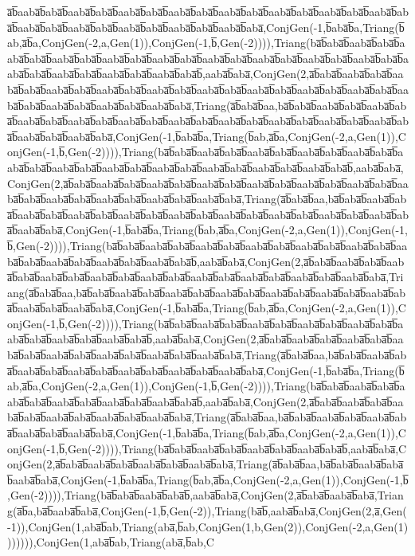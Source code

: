 a̅b̅aaba̅b̅aba̅b̅aaba̅b̅aba̅b̅aaba̅b̅aba̅b̅aaba̅b̅aba̅b̅aaba̅b̅aba̅b̅aaba̅b̅aba̅b̅aaba̅b̅aba̅b̅aaba̅b̅aba̅b̅aaba̅b̅aba̅b̅aaba̅b̅aba̅b̅aaba̅b̅aba̅b̅aaba̅b̅aba̅b̅aaba̅b̅aba̅,ConjGen(-1,b̅aba̅b̅a,Triang(b̅ab,a̅b̅a,ConjGen(-2,a,Gen(1)),ConjGen(-1,b̅,Gen(-2)))),Triang(ba̅b̅aba̅b̅aaba̅b̅aba̅b̅aaba̅b̅aba̅b̅aaba̅b̅aba̅b̅aaba̅b̅aba̅b̅aaba̅b̅aba̅b̅aaba̅b̅aba̅b̅aaba̅b̅aba̅b̅aaba̅b̅aba̅b̅aaba̅b̅aba̅b̅aaba̅b̅aba̅b̅aaba̅b̅aba̅b̅aaba̅b̅aba̅b̅aaba̅b̅aba̅b̅,aaba̅b̅aba̅,ConjGen(2,a̅b̅aba̅b̅aaba̅b̅aba̅b̅aaba̅b̅aba̅b̅aaba̅b̅aba̅b̅aaba̅b̅aba̅b̅aaba̅b̅aba̅b̅aaba̅b̅aba̅b̅aaba̅b̅aba̅b̅aaba̅b̅aba̅b̅aaba̅b̅aba̅b̅aaba̅b̅aba̅b̅aaba̅b̅aba̅b̅aaba̅b̅aba̅b̅aaba̅b̅aba̅,Triang(a̅b̅aba̅b̅aa,ba̅b̅aba̅b̅aaba̅b̅aba̅b̅aaba̅b̅aba̅b̅aaba̅b̅aba̅b̅aaba̅b̅aba̅b̅aaba̅b̅aba̅b̅aaba̅b̅aba̅b̅aaba̅b̅aba̅b̅aaba̅b̅aba̅b̅aaba̅b̅aba̅b̅aaba̅b̅aba̅b̅aaba̅b̅aba̅b̅aaba̅b̅aba̅,ConjGen(-1,b̅aba̅b̅a,Triang(b̅ab,a̅b̅a,ConjGen(-2,a,Gen(1)),ConjGen(-1,b̅,Gen(-2)))),Triang(ba̅b̅aba̅b̅aaba̅b̅aba̅b̅aaba̅b̅aba̅b̅aaba̅b̅aba̅b̅aaba̅b̅aba̅b̅aaba̅b̅aba̅b̅aaba̅b̅aba̅b̅aaba̅b̅aba̅b̅aaba̅b̅aba̅b̅aaba̅b̅aba̅b̅aaba̅b̅aba̅b̅aaba̅b̅aba̅b̅,aaba̅b̅aba̅,ConjGen(2,a̅b̅aba̅b̅aaba̅b̅aba̅b̅aaba̅b̅aba̅b̅aaba̅b̅aba̅b̅aaba̅b̅aba̅b̅aaba̅b̅aba̅b̅aaba̅b̅aba̅b̅aaba̅b̅aba̅b̅aaba̅b̅aba̅b̅aaba̅b̅aba̅b̅aaba̅b̅aba̅b̅aaba̅b̅aba̅,Triang(a̅b̅aba̅b̅aa,ba̅b̅aba̅b̅aaba̅b̅aba̅b̅aaba̅b̅aba̅b̅aaba̅b̅aba̅b̅aaba̅b̅aba̅b̅aaba̅b̅aba̅b̅aaba̅b̅aba̅b̅aaba̅b̅aba̅b̅aaba̅b̅aba̅b̅aaba̅b̅aba̅b̅aaba̅b̅aba̅,ConjGen(-1,b̅aba̅b̅a,Triang(b̅ab,a̅b̅a,ConjGen(-2,a,Gen(1)),ConjGen(-1,b̅,Gen(-2)))),Triang(ba̅b̅aba̅b̅aaba̅b̅aba̅b̅aaba̅b̅aba̅b̅aaba̅b̅aba̅b̅aaba̅b̅aba̅b̅aaba̅b̅aba̅b̅aaba̅b̅aba̅b̅aaba̅b̅aba̅b̅aaba̅b̅aba̅b̅aaba̅b̅aba̅b̅,aaba̅b̅aba̅,ConjGen(2,a̅b̅aba̅b̅aaba̅b̅aba̅b̅aaba̅b̅aba̅b̅aaba̅b̅aba̅b̅aaba̅b̅aba̅b̅aaba̅b̅aba̅b̅aaba̅b̅aba̅b̅aaba̅b̅aba̅b̅aaba̅b̅aba̅b̅aaba̅b̅aba̅,Triang(a̅b̅aba̅b̅aa,ba̅b̅aba̅b̅aaba̅b̅aba̅b̅aaba̅b̅aba̅b̅aaba̅b̅aba̅b̅aaba̅b̅aba̅b̅aaba̅b̅aba̅b̅aaba̅b̅aba̅b̅aaba̅b̅aba̅b̅aaba̅b̅aba̅,ConjGen(-1,b̅aba̅b̅a,Triang(b̅ab,a̅b̅a,ConjGen(-2,a,Gen(1)),ConjGen(-1,b̅,Gen(-2)))),Triang(ba̅b̅aba̅b̅aaba̅b̅aba̅b̅aaba̅b̅aba̅b̅aaba̅b̅aba̅b̅aaba̅b̅aba̅b̅aaba̅b̅aba̅b̅aaba̅b̅aba̅b̅aaba̅b̅aba̅b̅,aaba̅b̅aba̅,ConjGen(2,a̅b̅aba̅b̅aaba̅b̅aba̅b̅aaba̅b̅aba̅b̅aaba̅b̅aba̅b̅aaba̅b̅aba̅b̅aaba̅b̅aba̅b̅aaba̅b̅aba̅b̅aaba̅b̅aba̅,Triang(a̅b̅aba̅b̅aa,ba̅b̅aba̅b̅aaba̅b̅aba̅b̅aaba̅b̅aba̅b̅aaba̅b̅aba̅b̅aaba̅b̅aba̅b̅aaba̅b̅aba̅b̅aaba̅b̅aba̅,ConjGen(-1,b̅aba̅b̅a,Triang(b̅ab,a̅b̅a,ConjGen(-2,a,Gen(1)),ConjGen(-1,b̅,Gen(-2)))),Triang(ba̅b̅aba̅b̅aaba̅b̅aba̅b̅aaba̅b̅aba̅b̅aaba̅b̅aba̅b̅aaba̅b̅aba̅b̅aaba̅b̅aba̅b̅,aaba̅b̅aba̅,ConjGen(2,a̅b̅aba̅b̅aaba̅b̅aba̅b̅aaba̅b̅aba̅b̅aaba̅b̅aba̅b̅aaba̅b̅aba̅b̅aaba̅b̅aba̅,Triang(a̅b̅aba̅b̅aa,ba̅b̅aba̅b̅aaba̅b̅aba̅b̅aaba̅b̅aba̅b̅aaba̅b̅aba̅b̅aaba̅b̅aba̅,ConjGen(-1,b̅aba̅b̅a,Triang(b̅ab,a̅b̅a,ConjGen(-2,a,Gen(1)),ConjGen(-1,b̅,Gen(-2)))),Triang(ba̅b̅aba̅b̅aaba̅b̅aba̅b̅aaba̅b̅aba̅b̅aaba̅b̅aba̅b̅,aaba̅b̅aba̅,ConjGen(2,a̅b̅aba̅b̅aaba̅b̅aba̅b̅aaba̅b̅aba̅b̅aaba̅b̅aba̅,Triang(a̅b̅aba̅b̅aa,ba̅b̅aba̅b̅aaba̅b̅aba̅b̅aaba̅b̅aba̅,ConjGen(-1,b̅aba̅b̅a,Triang(b̅ab,a̅b̅a,ConjGen(-2,a,Gen(1)),ConjGen(-1,b̅,Gen(-2)))),Triang(ba̅b̅aba̅b̅aaba̅b̅aba̅b̅,aaba̅b̅aba̅,ConjGen(2,a̅b̅aba̅b̅aaba̅b̅aba̅,Triang(a̅b̅a,ba̅b̅aaba̅b̅aba̅,ConjGen(-1,b̅,Gen(-2)),Triang(ba̅b̅,aaba̅b̅aba̅,ConjGen(2,a̅,Gen(-1)),ConjGen(1,aba̅b̅ab,Triang(aba̅,b̅ab,ConjGen(1,b,Gen(2)),ConjGen(-2,a,Gen(1))))))),ConjGen(1,aba̅b̅ab,Triang(aba̅,b̅ab,C